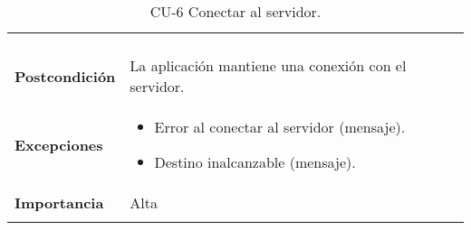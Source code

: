 \begin{longtable}[h!]{@{}ll@{}}
\begin{minipage}[t]{0.71\columnwidth}
\begin{enumerate}
\end{enumerate}\strut
\end{minipage}\tabularnewline
\begin{minipage}[t]{0.23\columnwidth}\raggedright\strut
\textbf{Postcondición}\strut
\end{minipage} & \begin{minipage}[t]{0.71\columnwidth}\raggedright\strut
La aplicación mantiene una conexión con el servidor.\strut
\end{minipage}\tabularnewline
\begin{minipage}[t]{0.23\columnwidth}\raggedright\strut
\textbf{Excepciones}\strut
\end{minipage} & \begin{minipage}[t]{0.71\columnwidth}\raggedright\strut
\begin{itemize}
\tightlist
\item
  Error al conectar al servidor (mensaje).
\item
  Destino inalcanzable (mensaje).
\end{itemize}\strut
\end{minipage}\tabularnewline
\begin{minipage}[t]{0.23\columnwidth}\raggedright\strut
\textbf{Importancia}\strut
\end{minipage} & \begin{minipage}[t]{0.71\columnwidth}\raggedright\strut
Alta\strut
\end{minipage}\tabularnewline
\bottomrule
\caption{CU-6 Conectar al servidor.}
\end{longtable}


